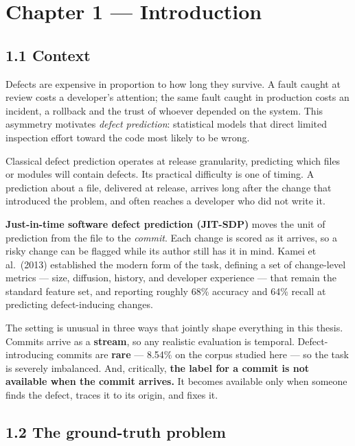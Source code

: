 \chapter{Chapter 1 --- Introduction}\label{chapter-1-introduction}

\section{1.1 Context}\label{context}

Defects are expensive in proportion to how long they survive. A fault
caught at review costs a developer's attention; the same fault caught in
production costs an incident, a rollback and the trust of whoever
depended on the system. This asymmetry motivates \emph{defect
prediction}: statistical models that direct limited inspection effort
toward the code most likely to be wrong.

Classical defect prediction operates at release granularity, predicting
which files or modules will contain defects. Its practical difficulty is
one of timing. A prediction about a file, delivered at release, arrives
long after the change that introduced the problem, and often reaches a
developer who did not write it.

\textbf{Just-in-time software defect prediction (JIT-SDP)} moves the
unit of prediction from the file to the \emph{commit}. Each change is
scored as it arrives, so a risky change can be flagged while its author
still has it in mind. Kamei et al.~(2013) established the modern form of
the task, defining a set of change-level metrics --- size, diffusion,
history, and developer experience --- that remain the standard feature
set, and reporting roughly 68\% accuracy and 64\% recall at predicting
defect-inducing changes.

The setting is unusual in three ways that jointly shape everything in
this thesis. Commits arrive as a \textbf{stream}, so any realistic
evaluation is temporal. Defect-introducing commits are \textbf{rare} ---
8.54\% on the corpus studied here --- so the task is severely
imbalanced. And, critically, \textbf{the label for a commit is not
available when the commit arrives.} It becomes available only when
someone finds the defect, traces it to its origin, and fixes it.

\section{1.2 The ground-truth problem}\label{the-ground-truth-problem}

